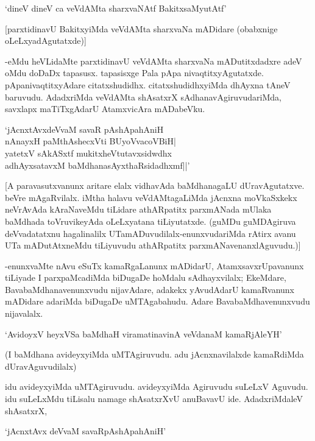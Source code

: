 \begin{shloka}
`dineV dineV ca veVdAMta sharxvaNAtf BakitxsaMyutAtf'
\end{shloka}

[parxtidinavU BakitxyiMda veVdAMta sharxvaNa mADidare (obabxnige oLeLxyadAgutatxde)]

-eMdu heVLidaMte parxtidinavU veVdAMta sharxvaNa mADutitxdadxre adeV oMdu doDaDx tapasusx. tapasisxge Pala pApa nivaqtitxyAgutatxde. pApanivaqtitxyAdare citatxshudidhx. citatxshudidhxyiMda dhAyxna tAneV baruvudu. AdadxriMda veVdAMta shAsatxrX sAdhanavAgiruvudariMda, savxlapx maTiTxgAdarU AtamxvicAra mADabeVku.

\begin{shloka}
`jAcnxtAvxdeVvaM savaR pAshApahAniH\\
nAnayxH paMthAshecxVti BUyoVvacoVBiH|\\
yatetxV sAkASxtf mukitxheVtutavxsidwdhx\\
adhAyxsatavxM baMdhanasAyxthaRsidadhxmf||'
\end{shloka}

[A paravasutxvanunx aritare elalx vidhavAda baMdhanagaLU dUravAgutatxve. beVre mAgaRvilalx. iMtha halavu veVdAMtagaLiMda jAcnxna moVkaSxkekx neVrAvAda kAraNaveMdu tiLidare athARpatitx parxmANada mUlaka baMdhada toVruvikeyAda oLeLxyatana tiLiyutatxde. (guMDu guMDAgiruva deVvadatatxnu hagalinalilx UTamADuvudilalx-enunxvudariMda rAtirx avanu UTa mADutAtxneMdu tiLiyuvudu athARpatitx parxmANavenanxlAguvudu.)]

-enunxvaMte nAvu eSuTx kamaRgaLanunx mADidarU, AtamxsavxrUpavanunx tiLiyade I parxpaMcadiMda biDugaDe hoMdalu sAdhayxvilalx; EkeMdare, BavabaMdhanavenunxvudu nijavAdare, adakekx yAvudAdarU kamaRvanunx mADidare adariMda biDugaDe uMTAgabahudu. Adare BavabaMdhavenunxvudu nijavalalx.

\begin{shloka}
`AvidoyxV heyxVSa baMdhaH viramatinavinA veVdanaM kamaRjAleYH'
\end{shloka}

(I baMdhana avideyxyiMda uMTAgiruvudu. adu jAcnxnavilalxde kamaRdiMda dUravAguvudilalx)

idu avideyxyiMda uMTAgiruvudu. avideyxyiMda Agiruvudu suLeLxV Aguvudu. idu suLeLxMdu tiLisalu namage shAsatxrXvU anuBavavU ide. AdadxriMdaleV shAsatxrX,

\begin{shloka}
`jAcnxtAvx deVvaM savaRpAshApahAniH'
\end{shloka}

